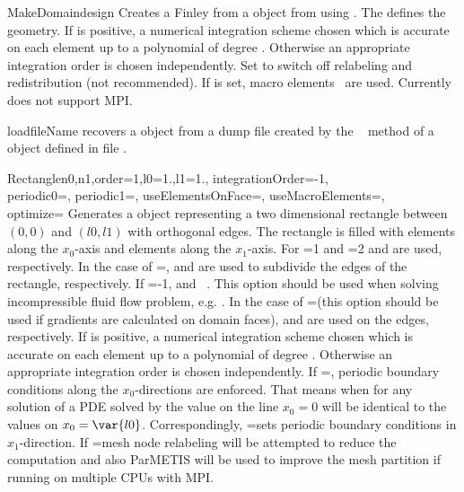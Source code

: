 \begin{funcdesc}{MakeDomain}{design}
Creates a Finley \Domain from a  object from \pycad using \gmshextern.
The   defines the geometry.
If  is positive, a numerical integration scheme
chosen which is accurate on each element up to a polynomial of
degree  . Otherwise
an appropriate integration order is chosen independently.
Set  to switch off relabeling and redistribution (not recommended).
If  is set, macro elements~ are used.
Currently  does not support MPI.
\end{funcdesc}


\begin{funcdesc}{load}{fileName}
recovers a \Domain object from a dump file created by the \
 method of a \Domain object defined in
file .
\end{funcdesc}


\begin{funcdesc}{Rectangle}{n0,n1,order=1,l0=1.,l1=1., integrationOrder=-1, \\
  periodic0=\False, periodic1=\False, useElementsOnFace=\False, useMacroElements=\False,\\ optimize=\False}
Generates a \Domain object representing a two dimensional rectangle between
$(0,0)$ and $(l0,l1)$ with orthogonal edges. The rectangle is filled with
\var{n0} elements along the $x_0$-axis and
 elements along the $x_1$-axis.
For =1 and \var{order}=2
 and
 are used, respectively.
In the case of =\False,
 and
 are used to subdivide the edges of the rectangle, respectively.
If \var{order}=-1, \finleyelement{Rec8Macro} and \finleyelement{Line3Macro}~. This option should be used when solving incompressible fluid flow problem, e.g. .
In the case of \var{useElementsOnFace}=\True (this option should be used if gradients
are calculated on domain faces),
 and
 are used on the edges, respectively.
If  is positive, a numerical integration scheme
chosen which is accurate on each element up to a polynomial of
degree  . Otherwise
an appropriate integration order is chosen independently. If
=\True, periodic boundary conditions 
along the $x_0$-directions are enforced. That means when for any solution of a PDE solved by \finley
the value on the line $x_0=0$ will be identical to the values on $x_0=\var{l0}$.
Correspondingly,
=\False sets periodic boundary conditions
in $x_1$-direction.
If =\True mesh node relabeling will be attempted to reduce the computation and also ParMETIS will be used to improve the mesh partition if running on multiple CPUs with MPI.
\end{funcdesc}


